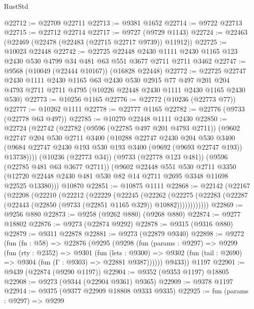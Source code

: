 \begin{lexlean}{RustStd}
\begin{coremodule}
{\begin{coremodule}
{{{{{{{{{{{{{{{{{{{{{{{{{{{{{{{{{{{{{{{{{{{{{{{{{{{{{{{@22712 := @22709 @22711
@22713 := @9381 @1652
@22714 := @9722 @22713
@22715 := @22712 @22714
@22717 := @9727 (@9729 @1143)
@22724 := @22463 (@22469 (@22478 (@22483 (@22715 @22717 @9739)) @11912))
@22725 := @10023 @22448
@22742 := @22725
    @22448
    @2430
    @1111
    @2430
    @1165
    @123
    @2430
    @530
    @4799
    @34
    @481
    @63
    @551
    @3677
    @2711
    @2711
    @3462
@22747 := @9568 (@10049 (@22444 @10167)) (@16828 @22448)
@22772 := @22725
    @22747
    @2430
    @1111
    @2430
    @1165
    @63
    @2430
    @530
    @2915
    @77
    @497
    @201
    @204
    @4793
    @2711
    @2711
    @4795
    (@10226 @22448 @2430 @1111 @2430 @1165 @2430 @530)
@22773 := @10256 @1165
@22776 := @22772 (@10236 (@22773 @77))
@22777 := @10262 @1111
@22778 := @22777 @1165
@22782 := @22776 (@9733 (@22778 @63 @497))
@22785 := @10270 @22448 @1111 @2430
@22850 := @22724
    (@22742
      (@22782
        (@9596 (@22785 @497 @201 @4793 @2711))
        (@9602
          @22747
          @204
          @530
          @2711
          @3400
          (@10288
            @22747
            @2430
            @204
            @530
            @3400
            (@9684 @22747 @2430 @193 @530 @193 @3400 (@9692 (@9693 @22747 @193)) @13738))))
      (@10236 (@22773 @34))
      (@9733 (@22778 @123 @481))
      (@9596 (@22785 @481 @63 @3677 @2711))
      (@9602
        @22448
        @551
        @530
        @2711
        @3350
        (@12720 @22448 @2430 @481 @530 @82 @14 @2711 @2695 @3348 @11698 @22525 @13380)))
    @10870
@22851 := @10875 @1111
@22868 := @22142
    (@22167
      (@22208
        (@22210
          (@22212
            (@22229
              (@22245
                (@22262
                  (@22275
                    (@22283 (@22287 (@22443 (@22850 (@9733 (@22851 @1165 @329)) @10882))))))))))))
@22869 := @9256 @880
@22873 := @9258 (@9262 @880) (@9268 @880)
@22874 := @9277 @18802
@22876 := @9273 (@22874 @9292)
@22878 := @9315 (@9316 @880)
@22879 := @9311 @22878
@22881 := @9273 (@22879 @9340)
@22898 := @9272
    (fun (fn : @58) =>
    @22876
      (@9295
        (@9298
          (fun (params : @9297) =>
          @9299
            (fun (rty : @2352) =>
            @9301
              (fun (lets : @9300) =>
              @9302 (fun (tail : @2690) => @9304 (fun (Γ : @9303) => @22881 @9387))))))
        @9433))
    @1197
@22901 := @9439 (@22874 (@9290 @1197))
@22904 := @9352 (@9353 @1197) @18805
@22908 := @9273 (@9344 (@22904 @9361) @9365)
@22909 := @9378 @1197
@22914 := @9375 (@9377 @22909 @18808 @9333 @9335)
@22925 := fun (params : @9297) =>
  @9299
}}}}}}}}}}}}}}}}}}}}}}}}}}}}}}}}}}}}}}}}}}}}}}}}}}}}}}}
\end{coremodule}}
\end{coremodule}
\end{lexlean}
